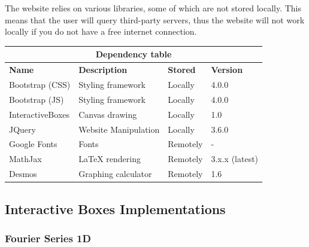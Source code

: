 \documentclass{article}
\begin{document}
The website relies on various libraries, some of which are not stored locally.
This means that the user will query third-party servers, thus the website will not work
locally if you do not have a free internet connection.

\medskip

\bgroup{}
\def\arraystretch{1.5}
\begin{center}
    \begin{tabular}{ |p{3cm}|p{4cm}|p{2cm}|p{2cm}| }
        \hline
        \multicolumn{4}{|c|}{\textbf{Dependency table}} \\
        \hline
        \textbf{Name} & \textbf{Description} & \textbf{Stored} & \textbf{Version} \\
        \hline
        Bootstrap (CSS) & Styling framework & Locally & 4.0.0 \\
        \hline
        Bootstrap (JS) & Styling framework & Locally & 4.0.0 \\
        \hline
        InteractiveBoxes & Canvas drawing & Locally & 1.0 \\
        \hline
        JQuery & Website Manipulation & Locally & 3.6.0 \\
        \hline
        Google Fonts & Fonts & Remotely & - \\
        \hline
        MathJax & LaTeX rendering & Remotely & 3.x.x (latest) \\
        \hline
        Desmos & Graphing calculator & Remotely & 1.6 \\
        \hline
    \end{tabular}
\end{center}
\egroup{}

\pagebreak

\subsection{Interactive Boxes Implementations}


\subsubsection{Fourier Series 1D}
\end{document}
